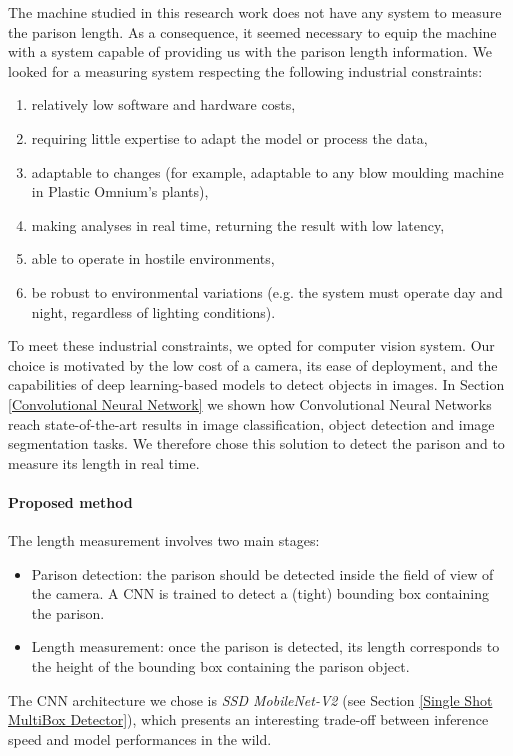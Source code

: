 The machine studied in this research work does not have any system to measure the parison length. As a consequence, it seemed necessary to equip the machine with a system capable of providing us with the parison length information. We looked for a measuring system respecting the following industrial constraints:
%
\begin{enumerate}
    \item relatively low software and hardware costs,
    \item requiring little expertise to adapt the model or process the data,
    \item adaptable to changes (for example, adaptable to any blow moulding machine in Plastic Omnium's plants),
    \item making analyses in real time, returning the result with low latency,
    \item able to operate in hostile environments,
    \item be robust to environmental variations (e.g. the system must operate day and night, regardless of lighting conditions).
\end{enumerate}
%
To meet these industrial constraints, we opted for computer vision system. Our choice is motivated by the low cost of a camera, its ease of deployment, and the capabilities of deep learning-based models to detect objects in images. In Section \ref{Convolutional Neural Network} we shown how Convolutional Neural Networks reach state-of-the-art results in image classification, object detection and image segmentation tasks. We therefore chose this solution to detect the parison and to measure its length in real time.

\paragraph{Proposed method}

The length measurement involves two main stages:
\begin{itemize}
    \item Parison detection: the parison should be detected inside the field of view of the camera. A CNN is trained to detect a (tight) bounding box containing the parison. 
    \item Length measurement: once the parison is detected, its length corresponds to the height of the bounding box containing the parison object.
\end{itemize}

The CNN architecture we chose is \textit{SSD MobileNet-V2} (see Section \ref{Single Shot MultiBox Detector}), which presents an interesting trade-off between inference speed and model performances in the wild. 


